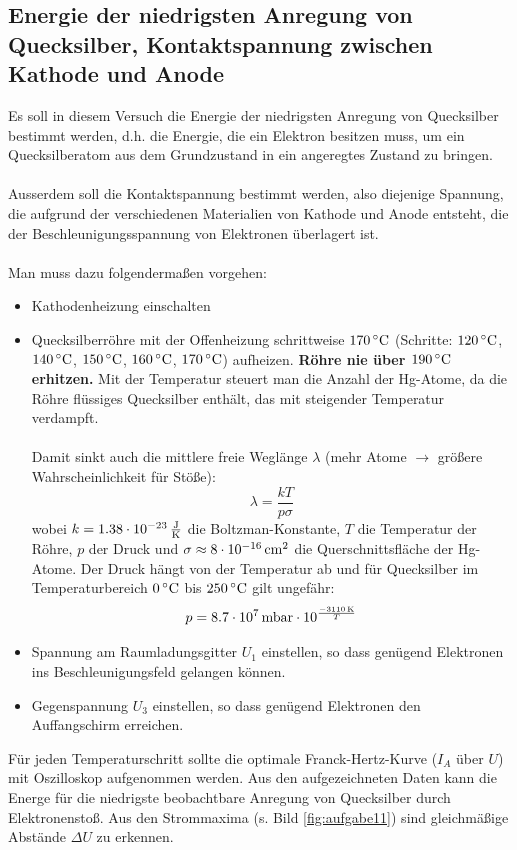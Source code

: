 \documentclass[a4paper,titlepage]{scrartcl}
\numberwithin{equation}{section}
\begin{document}
\subsection{Energie der niedrigsten Anregung von Quecksilber, Kontaktspannung zwischen Kathode und Anode}
Es soll in diesem Versuch die Energie der niedrigsten Anregung von Quecksilber bestimmt werden, d.h. die Energie, die ein Elektron besitzen muss, um ein Quecksilberatom aus dem Grundzustand in ein angeregtes Zustand zu bringen.\\ \\
Ausserdem soll die Kontaktspannung bestimmt werden, also diejenige Spannung, die aufgrund der verschiedenen Materialien von Kathode und Anode entsteht, die der Beschleunigungsspannung von Elektronen überlagert ist.\\ \\
Man muss dazu folgendermaßen vorgehen:
\begin{itemize}
\item Kathodenheizung einschalten
\item Quecksilberröhre mit der Offenheizung schrittweise $\unit[170]{^{\circ}C}$ (Schritte: $\unit[120]{^{\circ}C}$, $\unit[140]{^{\circ}C}$, $\unit[150]{^{\circ}C}$, $\unit[160]{^{\circ}C}$, $\unit[170]{^{\circ}C}$) aufheizen. \textbf{Röhre nie über $\unit[190]{^{\circ} C}$ erhitzen.} Mit der Temperatur steuert man die Anzahl der Hg-Atome, da die Röhre flüssiges Quecksilber enthält, das mit steigender Temperatur verdampft.\\ \\ Damit sinkt auch die mittlere freie Weglänge $\lambda$ (mehr Atome $\to$ größere Wahrscheinlichkeit für Stöße):
\begin{equation}
\lambda=\frac{kT}{p \sigma}
\end{equation}
wobei $k=\unit[1.38 \cdot 10^{-23}]{\frac{J}{K}}$ die Boltzman-Konstante, $T$ die Temperatur der Röhre, $p$ der Druck und $\sigma\approx \unit[8 \cdot 10^{-16}]{cm^2} $ die Querschnittsfläche der Hg-Atome. Der Druck hängt von der Temperatur ab und für Quecksilber im Temperaturbereich $\unit[0]{^{\circ}C}$ bis $\unit[250]{^{\circ}C}$ gilt ungefähr:
\begin{equation}
p=\unit[8.7 \cdot 10^7]{mbar} \cdot 10^{\frac{\unit[-3110]{K}}{T}}
\end{equation}
\item Spannung am Raumladungsgitter $U_1$ einstellen, so dass genügend Elektronen ins Beschleunigungsfeld gelangen können.
\item Gegenspannung $U_3$ einstellen, so dass genügend Elektronen den Auffangschirm erreichen.
\end{itemize}
Für jeden Temperaturschritt sollte die optimale Franck-Hertz-Kurve ($I_A$ über $U$) mit Oszilloskop aufgenommen werden. Aus den aufgezeichneten Daten kann die Energe für die niedrigste beobachtbare Anregung von Quecksilber durch Elektronenstoß. Aus den Strommaxima (s. Bild \ref{fig:aufgabe11}) sind gleichmäßige Abstände $\Delta U$ zu erkennen.
\end{document}
